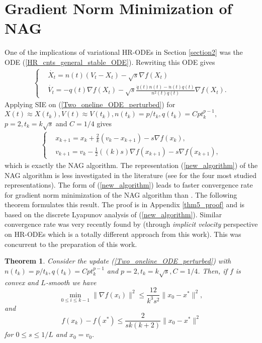 \documentclass{article}
\theoremstyle{plain}
\newtheorem{theorem}{Theorem}[section]
\theoremstyle{definition}
\theoremstyle{remark}
\begin{document}
\section{Gradient Norm Minimization of NAG}\label{section3}
One of the implications of variational HR-ODEs in Section \ref{section2} was the ODE (\ref{HR_cnts_general_stable_ODE}). Rewriting this ODE gives
\begin{align}\label{Two_oneline_ODE_perturbed}
   \left\{ \begin{array}{ll}
    & \dot{X_t}   =     n(t)(V_t-X_t)-\sqrt{s}\nabla f(X_t)\\
     &\dot{V_t}    =  -q(t)\nabla f(X_t) - \sqrt{s}\frac{\dot q(t)n(t)-\dot n(t)q(t)}{n^2(t)q(t)} \nabla f(X_t).
    \end{array}\right.
\end{align}
Applying SIE on (\ref{Two_oneline_ODE_perturbed}) for \({X(t) \approx X(t_k), V(t)\approx V(t_k),n(t_k)=p/t_k,q(t_k)=Cpt_k^{p-1},}\) 
\({ p=2,t_k=k\sqrt{s}}\) and \(C=1/4\) gives 
\begin{align}\label{new_algorithm}
   \left\{ \begin{array}{ll}
    &x_{k+1}   =    x_{k} + \frac{2}{k}(v_k-x_{k+1})-{s}\nabla f(x_k),\\
     &v_{k+1}    = v_k -\tfrac{1}{2}((k)s)\nabla f(x_{k+1})-s\nabla f(x_{k+1}), 
    \end{array}\right.
\end{align}
 which is exactly the NAG algorithm. The representation (\ref{new_algorithm}) of the NAG algorithm is less investigated in the literature (see \citep{ahn2022understanding} for the four most studied representations). The form of (\ref{new_algorithm}) leads to faster convergence rate for gradient norm minimization of the NAG algorithm than \citep{Shi2021UnderstandingTA}. The following theorem formulates this result. The proof is in Appendix \ref{thm5_proof} and is based on the discrete Lyapunov analysis of (\ref{new_algorithm}). Similar convergence rate was very recently found by \citep{chen2022gradient} (through \textit{implicit velocity} perspective on HR-ODEs which is a totally different approach from this work). This was concurrent to the preparation of this work.
\begin{theorem}\label{theorem4}
    Consider the update (\ref{Two_oneline_ODE_perturbed}) with \(n(t_k)=p/t_k,q(t_k)=Cpt_k^{p-1}\) and \(p=2,t_k=k\sqrt{s},C=1/4\). Then, if \(f\) is convex and \(L\)-smooth we have
    \[\min_{0\leq i\leq k-1}\|\nabla f(x_i)\|^2 \leq \frac{12}{k^3s^2}\|x_0-x^*\|^2,\]
    and
    \[f(x_k)-f(x^*)\leq \frac{2}{sk(k+2)}\|x_0-x^*\|^2\]
    for \(0\leq s\leq 1/L\) and \(x_0=v_0\).
\end{theorem}
\end{document}
